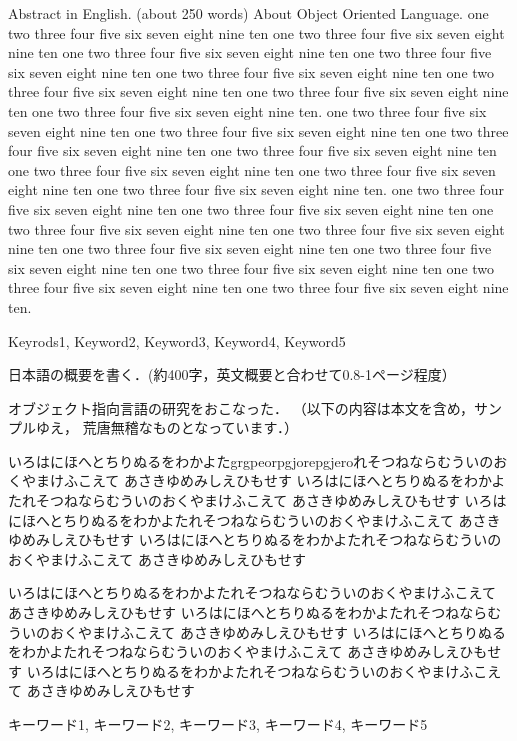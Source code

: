 \begin{eabstract}
    Abstract in English. (about 250 words)
    About Object Oriented Language.
    one two three four five six seven eight nine ten
    one two three four five six seven eight nine ten
    one two three four five six seven eight nine ten
    one two three four five six seven eight nine ten
    one two three four five six seven eight nine ten
    one two three four five six seven eight nine ten
    one two three four five six seven eight nine ten
    one two three four five six seven eight nine ten.
    one two three four five six seven eight nine ten
    one two three four five six seven eight nine ten
    one two three four five six seven eight nine ten
    one two three four five six seven eight nine ten
    one two three four five six seven eight nine ten
    one two three four five six seven eight nine ten
    one two three four five six seven eight nine ten.
    one two three four five six seven eight nine ten
    one two three four five six seven eight nine ten
    one two three four five six seven eight nine ten
    one two three four five six seven eight nine ten
    one two three four five six seven eight nine ten
    one two three four five six seven eight nine ten
    one two three four five six seven eight nine ten
    one two three four five six seven eight nine ten
    one two three four five six seven eight nine ten.
\end{eabstract} 
\begin{ekeyword}
    Keyrods1, Keyword2, Keyword3, Keyword4, Keyword5
\end{ekeyword}
\begin{jabstract}
    日本語の概要を書く．(約400字，英文概要と合わせて0.8-1ページ程度）
    
    オブジェクト指向言語の研究をおこなった．
    （以下の内容は本文を含め，サンプルゆえ，
    荒唐無稽なものとなっています．）
    
    いろはにほへとちりぬるをわかよたgrgpeorpgjorepgjeroれそつねならむういのおくやまけふこえて
    あさきゆめみしえひもせす
    いろはにほへとちりぬるをわかよたれそつねならむういのおくやまけふこえて
    あさきゆめみしえひもせす
    いろはにほへとちりぬるをわかよたれそつねならむういのおくやまけふこえて
    あさきゆめみしえひもせす
    いろはにほへとちりぬるをわかよたれそつねならむういのおくやまけふこえて
    あさきゆめみしえひもせす
    
    いろはにほへとちりぬるをわかよたれそつねならむういのおくやまけふこえて
    あさきゆめみしえひもせす
    いろはにほへとちりぬるをわかよたれそつねならむういのおくやまけふこえて
    あさきゆめみしえひもせす
    いろはにほへとちりぬるをわかよたれそつねならむういのおくやまけふこえて
    あさきゆめみしえひもせす
    いろはにほへとちりぬるをわかよたれそつねならむういのおくやまけふこえて
    あさきゆめみしえひもせす
    
\end{jabstract}
\begin{jkeyword}
    キーワード1, キーワード2, キーワード3, キーワード4, キーワード5
\end{jkeyword}